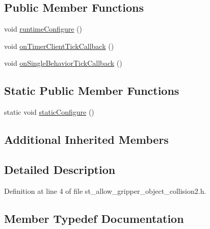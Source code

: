 \subsection*{Public Member Functions}
\begin{DoxyCompactItemize}
\item 
void \hyperlink{structsm__mtc__pour_1_1StAllowGripperObjectCollision2_a36c13bc158273e48b4b387be634d73d5}{runtime\+Configure} ()
\item 
void \hyperlink{structsm__mtc__pour_1_1StAllowGripperObjectCollision2_a79a5df408d720ccb9a7d04824df0012d}{on\+Timer\+Client\+Tick\+Callback} ()
\item 
void \hyperlink{structsm__mtc__pour_1_1StAllowGripperObjectCollision2_abb0fa7e24bfe375ccc6a2f2093178fba}{on\+Single\+Behavior\+Tick\+Callback} ()
\end{DoxyCompactItemize}
\subsection*{Static Public Member Functions}
\begin{DoxyCompactItemize}
\item 
static void \hyperlink{structsm__mtc__pour_1_1StAllowGripperObjectCollision2_a1bd0eb3496bf831a83fc545a64a89dad}{static\+Configure} ()
\end{DoxyCompactItemize}
\subsection*{Additional Inherited Members}


\subsection{Detailed Description}


Definition at line 4 of file st\+\_\+allow\+\_\+gripper\+\_\+object\+\_\+collision2.\+h.



\subsection{Member Typedef Documentation}
